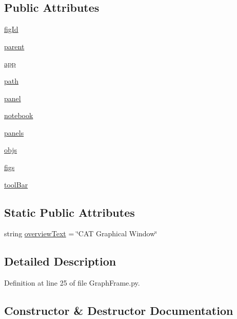 \subsection*{Public Attributes}
\begin{DoxyCompactItemize}
\item 
\hyperlink{classGraphFrame_1_1GraphFrame_a7075285ad02fd2080b89030d8b2b4f1f}{fig\+Id}
\item 
\hyperlink{classGraphFrame_1_1GraphFrame_a2e037073bd21eb4b1ce33d0763c553ac}{parent}
\item 
\hyperlink{classGraphFrame_1_1GraphFrame_adffc22a75c32a310a9f15d5d9d39c585}{app}
\item 
\hyperlink{classGraphFrame_1_1GraphFrame_ae056809f5cf0d296c53738e7b7965fbd}{path}
\item 
\hyperlink{classGraphFrame_1_1GraphFrame_af52ab0f13e5117c0cdaa3cade3f04eda}{panel}
\item 
\hyperlink{classGraphFrame_1_1GraphFrame_afa157e331c533963e6ad5c8e0e808999}{notebook}
\item 
\hyperlink{classGraphFrame_1_1GraphFrame_abe229e95196e9132c31fc47bb1342d39}{panels}
\item 
\hyperlink{classGraphFrame_1_1GraphFrame_a2f83944a4fed433a745817d7bf39550f}{objs}
\item 
\hyperlink{classGraphFrame_1_1GraphFrame_ab8a1a588df91f01631e4af5f72e8a581}{figs}
\item 
\hyperlink{classGraphFrame_1_1GraphFrame_a8adc9094b9ee3ef5bfd446cc6b1b335c}{tool\+Bar}
\end{DoxyCompactItemize}
\subsection*{Static Public Attributes}
\begin{DoxyCompactItemize}
\item 
string \hyperlink{classGraphFrame_1_1GraphFrame_a9abea07b31cb5c6c71077bb51ed5906e}{overview\+Text} = \char`\"{}C\+AT Graphical Window\char`\"{}
\end{DoxyCompactItemize}


\subsection{Detailed Description}


Definition at line 25 of file Graph\+Frame.\+py.



\subsection{Constructor \& Destructor Documentation}
\mbox{\label{classGraphFrame_1_1GraphFrame_ad9dbffb33edafd35f798052e29ace443}} 
